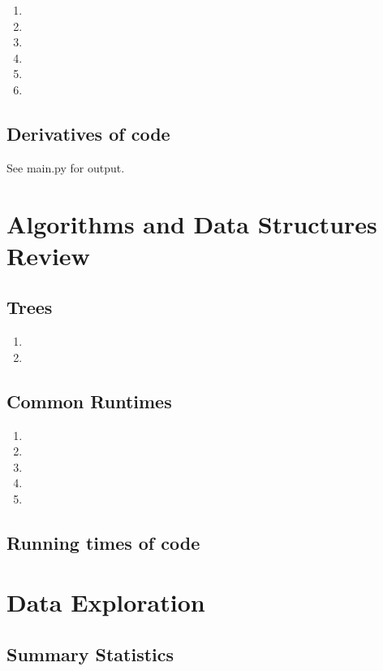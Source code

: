 \documentclass{article}
\begin{document}
\begin{enumerate}
\item
\item
\item
\item
\item
\item
\end{enumerate}

\subsection{Derivatives of code}

See main.py for output.

\section{Algorithms and Data Structures Review}

\subsection{Trees}

\begin{enumerate}
\item
\item
\end{enumerate}

\subsection{Common Runtimes}

\begin{enumerate}
\item
\item
\item
\item
\item
\end{enumerate}

\subsection{Running times of code}

\section{Data Exploration}

\subsection{Summary Statistics}
\end{document}
